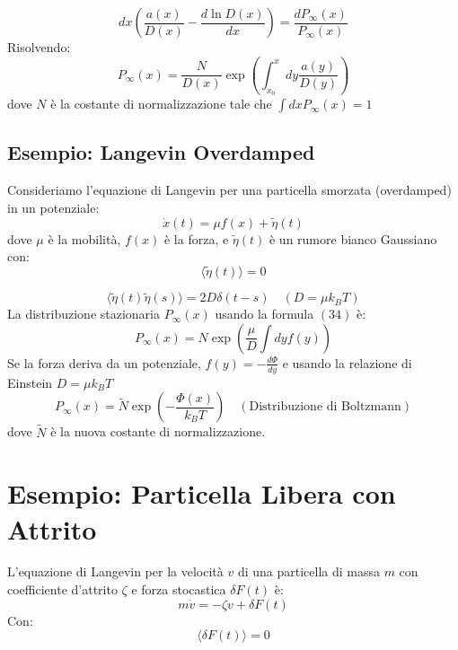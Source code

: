 \begin{equation}
dx \left( \frac{a(x)}{D(x)} - \frac{d \ln D(x)}{dx} \right) = \frac{d P_{\infty}(x)}{P_{\infty}(x)}
\end{equation}
Risolvendo:
\begin{equation}
P_{\infty}(x) = \frac{N}{D(x)} \exp\left( \int^x_{x_0} dy \frac{a(y)}{D(y)} \right)
\end{equation}
dove $N$ è la costante di normalizzazione tale che $\int dx P_{\infty}(x) = 1$

\subsection{Esempio: Langevin Overdamped}

Consideriamo l'equazione di Langevin per una particella smorzata (overdamped) in un potenziale:
\begin{equation}
\dot{x}(t) = \mu f(x) + \tilde{\eta}(t)
\end{equation}
dove $\mu$ è la mobilità, $f(x)$ è la forza, e $\tilde{\eta}(t)$ è un rumore bianco Gaussiano con:
\begin{equation*}
\langle \tilde{\eta}(t) \rangle = 0
\end{equation*}

\begin{equation*}
\langle \tilde{\eta}(t) \tilde{\eta}(s) \rangle = 2D \delta(t-s) \quad (D = \mu k_B T)
\end{equation*}
La distribuzione stazionaria $P_{\infty}(x)$ usando la formula $(34)$ è:
\begin{equation}
P_{\infty}(x) = N\exp\left( \frac{\mu}{D} \int dy f(y) \right)
\end{equation}
Se la forza deriva da un potenziale, $f(y) = -\frac{d\Phi}{dy}$ e usando la relazione di Einstein $D = \mu k_B T$
\begin{equation}
P_{\infty}(x) = \tilde{N} \exp\left( -\frac{\Phi(x)}{k_B T} \right) \quad (\text{Distribuzione di Boltzmann})
\end{equation}
dove $\tilde{N}$ è la nuova costante di normalizzazione. 

\section{Esempio: Particella Libera con Attrito }

L'equazione di Langevin per la velocità $v$ di una particella di massa $m$ con coefficiente d'attrito $\zeta$ e forza stocastica $\delta F(t)$ è:
\begin{equation}
m\dot{v} = -\zeta v + \delta F(t)
\end{equation}
Con:
\begin{equation}
\langle \delta F(t) \rangle = 0
\end{equation}

